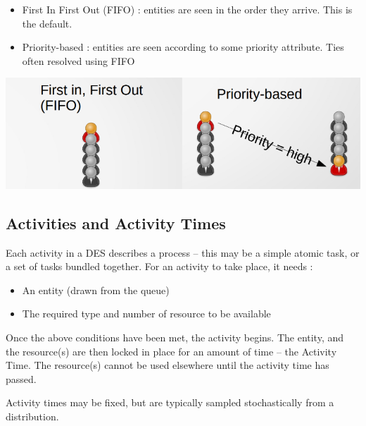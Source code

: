 \documentclass[
  letterpaper,
  DIV=11,
  numbers=noendperiod]{scrreprt}
\providecommand{\tightlist}{%
  \setlength{\itemsep}{0pt}\setlength{\parskip}{0pt}}\usepackage{longtable,booktabs,array}
\begin{document}
\begin{itemize}
\tightlist
\item
  First In First Out (FIFO) : entities are seen in the order they
  arrive. This is the default.
\item
  Priority-based : entities are seen according to some priority
  attribute. Ties often resolved using FIFO
\end{itemize}

\includegraphics{images/queue_types.png}

\subsection{Activities and Activity
Times}\label{activities-and-activity-times}

Each activity in a DES describes a process -- this may be a simple
atomic task, or a set of tasks bundled together. For an activity to take
place, it needs :

\begin{itemize}
\tightlist
\item
  An entity (drawn from the queue)
\item
  The required type and number of resource to be available
\end{itemize}

Once the above conditions have been met, the activity begins. The
entity, and the resource(s) are then locked in place for an amount of
time -- the Activity Time. The resource(s) cannot be used elsewhere
until the activity time has passed.

Activity times may be fixed, but are typically sampled stochastically
from a distribution.
\end{document}
